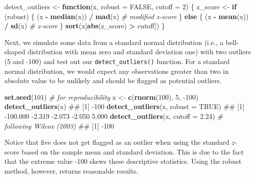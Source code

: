 \documentclass[]{book}
\newenvironment{Shaded}{\begin{snugshade}}{\end{snugshade}}
\newcommand{\CommentTok}[1]{\textcolor[rgb]{0.56,0.35,0.01}{\textit{#1}}}
\newcommand{\ControlFlowTok}[1]{\textcolor[rgb]{0.13,0.29,0.53}{\textbf{#1}}}
\newcommand{\DataTypeTok}[1]{\textcolor[rgb]{0.13,0.29,0.53}{#1}}
\newcommand{\DecValTok}[1]{\textcolor[rgb]{0.00,0.00,0.81}{#1}}
\newcommand{\FloatTok}[1]{\textcolor[rgb]{0.00,0.00,0.81}{#1}}
\newcommand{\KeywordTok}[1]{\textcolor[rgb]{0.13,0.29,0.53}{\textbf{#1}}}
\newcommand{\NormalTok}[1]{#1}
\newcommand{\OperatorTok}[1]{\textcolor[rgb]{0.81,0.36,0.00}{\textbf{#1}}}
\newcommand{\OtherTok}[1]{\textcolor[rgb]{0.56,0.35,0.01}{#1}}
\newcommand{\StringTok}[1]{\textcolor[rgb]{0.31,0.60,0.02}{#1}}
\theoremstyle{definition}
\theoremstyle{definition}
\theoremstyle{definition}
\theoremstyle{remark}
\begin{document}
\begin{Shaded}
\begin{Highlighting}[]
\NormalTok{detect_outliers <-}\StringTok{ }\ControlFlowTok{function}\NormalTok{(x, }\DataTypeTok{robust =} \OtherTok{FALSE}\NormalTok{, }\DataTypeTok{cutoff =} \DecValTok{2}\NormalTok{) \{}
\NormalTok{  z_score <-}\StringTok{ }\ControlFlowTok{if}\NormalTok{ (robust) \{}
\NormalTok{    (x }\OperatorTok{-}\StringTok{ }\KeywordTok{median}\NormalTok{(x)) }\OperatorTok{/}\StringTok{ }\KeywordTok{mad}\NormalTok{(x)  }\CommentTok{# modified z-score}
\NormalTok{  \} }\ControlFlowTok{else}\NormalTok{ \{}
\NormalTok{    (x }\OperatorTok{-}\StringTok{ }\KeywordTok{mean}\NormalTok{(x)) }\OperatorTok{/}\StringTok{ }\KeywordTok{sd}\NormalTok{(x)  }\CommentTok{# z-score}
\NormalTok{  \}}
  \KeywordTok{sort}\NormalTok{(x[}\KeywordTok{abs}\NormalTok{(z_score) }\OperatorTok{>}\StringTok{ }\NormalTok{cutoff])}
\NormalTok{\}}
\end{Highlighting}
\end{Shaded}

Next, we simulate some data from a standard normal distribution (i.e., a
bell-shaped distribution with mean zero and standard deviation one) with
two outliers (5 and -100) and test out our \texttt{detect\_outliers()}
function. For a standard normal distribution, we would expect any
observations greater than two in absolute value to be unlikely and
should be flagged as potential outliers.

\begin{Shaded}
\begin{Highlighting}[]
\KeywordTok{set.seed}\NormalTok{(}\DecValTok{101}\NormalTok{)  }\CommentTok{# for reproducibility}
\NormalTok{x <-}\StringTok{ }\KeywordTok{c}\NormalTok{(}\KeywordTok{rnorm}\NormalTok{(}\DecValTok{100}\NormalTok{), }\DecValTok{5}\NormalTok{, }\DecValTok{-100}\NormalTok{)}
\KeywordTok{detect_outliers}\NormalTok{(x)}
\NormalTok{## [1] -100}
\KeywordTok{detect_outliers}\NormalTok{(x, }\DataTypeTok{robust =} \OtherTok{TRUE}\NormalTok{)}
\NormalTok{## [1] -100.000   -2.319   -2.073   -2.050    5.000}
\KeywordTok{detect_outliers}\NormalTok{(x, }\DataTypeTok{cutoff =} \FloatTok{2.24}\NormalTok{)  }\CommentTok{# following Wilcox (2003)}
\NormalTok{## [1] -100}
\end{Highlighting}
\end{Shaded}

Notice that five does not get flagged as an outlier when using the
standard \(z\)-score based on the sample mean and standard deviation.
This is due to the fact that the extreme value -100 skews these
descriptive statistics. Using the robust method, however, returns
reasonable results.
\end{document}
